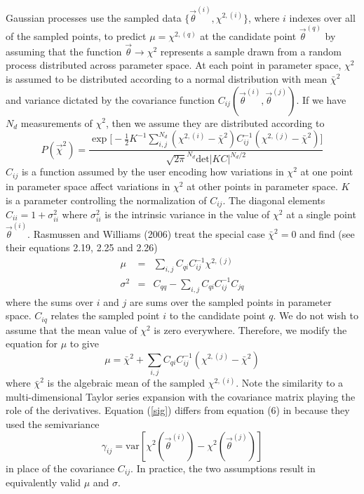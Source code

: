 \documentclass[useAMS,usenatbib]{aastex}
\begin{document}
Gaussian processes use the sampled data $\{\vec{\theta}^{(i)},\chi^{2,(i)}\}$, 
where $i$ indexes over all of the sampled points, to predict
$\mu=\chi^{2,(q)}$ at the candidate point 
$\vec{\theta}^{(q)}$ by assuming that the function
$\vec{\theta}\rightarrow\chi^2$ represents a sample drawn from a random process 
distributed
across parameter space.  At each point in parameter space, 
$\chi^2$ is assumed to be
distributed according to a normal distribution with mean 
$\bar{\chi}^2$
and variance dictated by the covariance function 
$C_{ij}(\vec{\theta}^{(i)},\vec{\theta}^{(j)})$.
If we have $N_d$ measurements of $\chi^2$, then we assume
they are distributed according to
\begin{equation}
\label{eq:likelihood}
P(\vec{\chi}^2)=
\frac{\exp\bigg[-\frac{1}{2}K^{-1}\sum_{i,j}^{N_d}
(\chi^{2,(i)}-\bar{\chi}^2)C^{-1}_{ij}
(\chi^{2,(j)}-\bar{\chi}^2)\bigg]}{\sqrt{2\pi}^{N_d}\text{det}|KC|^{N_d/2}}
\end{equation}
$C_{ij}$ is a function assumed by the user encoding how variations in
$\chi^2$ at one point in parameter space affect variations in 
$\chi^2$ at other
points in parameter space.  $K$ is a parameter controlling the
normalization of $C_{ij}$.
The diagonal elements $C_{ii}=1+\sigma^2_{ii}$ where 
$\sigma^2_{ii}$ is the intrinsic variance in the value
of $\chi^2$ at a single point $\vec{\theta}^{(i)}$.  
Rasmussen and Williams (2006) treat 
the special case
$\bar{\chi}^2=0$ and find (see their equations 2.19, 2.25 and 2.26)
\begin{eqnarray}
\mu&=&\sum_{i,j} C_{qi}C^{-1}_{ij}\chi^{2,(j)}\nonumber\\
\sigma^2&=&C_{qq}-\sum_{i,j}C_{qi}C^{-1}_{ij}C_{jq}\label{sig}
\end{eqnarray}
where the sums over $i$ and $j$ are sums over the sampled points 
in parameter space.  $C_{iq}$ relates the sampled point $i$ to the candidate
point $q$.
We do not wish to assume that the mean value of $\chi^2$ is zero everywhere.
Therefore, we modify the equation for $\mu$ to give
\begin{equation}
\label{mu}
\mu=\bar{\chi}^2+\sum_{i,j} C_{qi}C^{-1}_{ij}
(\chi^{2,(j)}-\bar{\chi}^2)
\end{equation}
where $\bar{\chi}^2$ is the algebraic mean of the 
sampled $\chi^{2,(i)}$.
Note the similarity to a multi-dimensional Taylor series expansion with the
covariance matrix playing the role of the derivatives.
Equation (\ref{sig}) differs from equation (6) in \cite{bryan} because
they used the semivariance
$$\gamma_{ij}=\text{var}[\chi^2(\vec{\theta}^{(i)})
-\chi^2(\vec{\theta}^{(j)})]$$
in place of the covariance $C_{ij}$.  In practice, the two assumptions result in
equivalently valid $\mu$ and $\sigma$.
\end{document}
